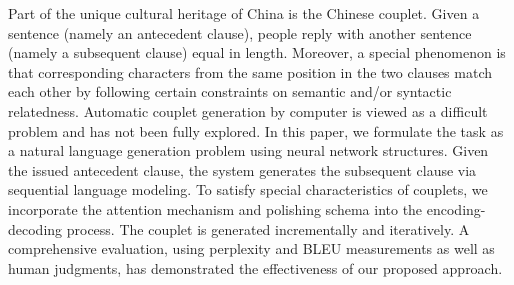Part of the unique cultural heritage of China is the Chinese couplet. Given a sentence (namely an antecedent clause), people reply with another sentence (namely a subsequent clause) equal in length. Moreover, a special phenomenon is that corresponding characters from the same position in the two clauses match each other by following certain constraints on semantic and/or syntactic relatedness. Automatic couplet generation by computer is viewed as a difficult problem and has not been fully explored. In this paper, we formulate the task as a natural language generation problem using neural network structures. Given the issued antecedent clause, the system generates the subsequent clause via sequential language modeling. To satisfy special characteristics of couplets, we incorporate the attention mechanism and polishing schema into the encoding-decoding process. The couplet is generated incrementally and iteratively. A comprehensive evaluation, using perplexity and BLEU measurements as well as human judgments, has demonstrated the effectiveness of our proposed approach.

